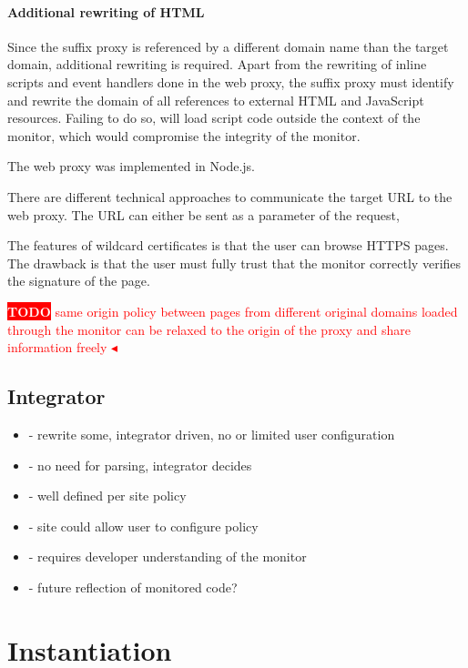 \documentclass{llncs}
\newcommand{\todo}[1]{\colorbox{red}{\textcolor{white}{\sffamily\bfseries\scriptsize TODO}} \textcolor{red}{#1} \textcolor{red}{$\blacktriangleleft$}}
\begin{document}
\paragraph{Additional rewriting of HTML}
Since the suffix proxy is referenced by a different domain name than the target 
domain, additional rewriting is required. Apart from the rewriting of inline 
scripts and event handlers done in the web proxy, the suffix proxy must 
identify and rewrite the domain of all references to external HTML and 
JavaScript resources. Failing to do so, will load script code outside the 
context of the monitor, which would compromise the integrity of the monitor.

The web proxy was implemented in Node.js. 

There are different technical approaches to communicate the target URL to the web 
proxy. The URL can either be sent as a parameter of the request, 

The features of wildcard certificates is that the user can browse HTTPS pages. The drawback is that the user must fully trust that the monitor correctly verifies the signature of the page.

\todo{same origin policy between pages from different original domains loaded through the monitor can be relaxed to the origin of the proxy and share information freely}



\subsection{Integrator}

\begin{itemize}
\item- rewrite some, integrator driven, no or limited user configuration
\item- no need for parsing, integrator decides
\item- well defined per site policy
\item- site could allow user to configure policy
\item- requires developer understanding of the monitor
\item- future reflection of monitored code?
\end{itemize}


\section{Instantiation}
\label{sec:case}
\end{document}
